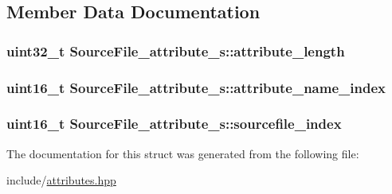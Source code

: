 \subsection{Member Data Documentation}
\hypertarget{structSourceFile__attribute__s_a3aad253479910514937e30e6874c37cd}{
\subsubsection[{attribute\+\_\+length}]{\setlength{\rightskip}{0pt plus 5cm}uint32\+\_\+t Source\+File\+\_\+attribute\+\_\+s\+::attribute\+\_\+length}}\label{structSourceFile__attribute__s_a3aad253479910514937e30e6874c37cd}
\hypertarget{structSourceFile__attribute__s_af373e87d77acccb3b69b491062fa12ea}{
\subsubsection[{attribute\+\_\+name\+\_\+index}]{\setlength{\rightskip}{0pt plus 5cm}uint16\+\_\+t Source\+File\+\_\+attribute\+\_\+s\+::attribute\+\_\+name\+\_\+index}}\label{structSourceFile__attribute__s_af373e87d77acccb3b69b491062fa12ea}
\hypertarget{structSourceFile__attribute__s_a58a666cf2e0ffd0557d6edc270bf195f}{
\subsubsection[{sourcefile\+\_\+index}]{\setlength{\rightskip}{0pt plus 5cm}uint16\+\_\+t Source\+File\+\_\+attribute\+\_\+s\+::sourcefile\+\_\+index}}\label{structSourceFile__attribute__s_a58a666cf2e0ffd0557d6edc270bf195f}


The documentation for this struct was generated from the following file\+:\begin{DoxyCompactItemize}
\item 
include/\hyperlink{attributes_8hpp}{attributes.\+hpp}\end{DoxyCompactItemize}
